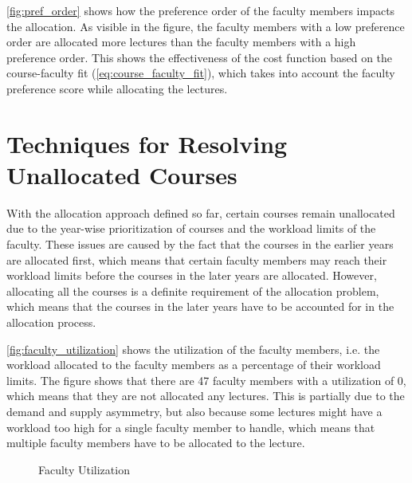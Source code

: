 \autoref{fig:pref_order} shows how the preference order of the faculty members impacts the allocation. As visible in the figure, the faculty members with a low preference order are allocated more lectures than the faculty members with a high preference order. This shows the effectiveness of the cost function based on the course-faculty fit (\autoref{eq:course_faculty_fit}), which takes into account the faculty preference score while allocating the lectures.

\section{Techniques for Resolving Unallocated Courses}
\label{sec:rectifying_unallocated_courses}

With the allocation approach defined so far, certain courses remain unallocated due to the year-wise prioritization of courses and the workload limits of the faculty. These issues are caused by the fact that the courses in the earlier years are allocated first, which means that certain faculty members may reach their workload limits before the courses in the later years are allocated. However, allocating all the courses is a definite requirement of the allocation problem, which means that the courses in the later years have to be accounted for in the allocation process.

\autoref{fig:faculty_utilization} shows the utilization of the faculty members, i.e. the workload allocated to the faculty members as a percentage of their workload limits. The figure shows that there are 47 faculty members with a utilization of 0, which means that they are not allocated any lectures. This is partially due to the demand and supply asymmetry, but also because some lectures might have a workload too high for a single faculty member to handle, which means that multiple faculty members have to be allocated to the lecture.

\begin{figure}[H]
  \centering
  \caption{Faculty Utilization}
  \label{fig:faculty_utilization}
\end{figure}

